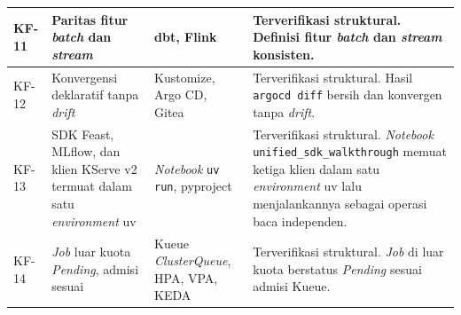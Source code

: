 {\begin{longtable}{|>{\centering\arraybackslash}m{1.7cm}|m{3.9cm}|m{2.8cm}|m{4.4cm}|}
\hline
KF-11 & Paritas fitur \textit{batch} dan \textit{stream} & dbt, Flink & Terverifikasi struktural. Definisi fitur \textit{batch} dan \textit{stream} konsisten. \\
\hline
KF-12 & Konvergensi deklaratif tanpa \textit{drift} & Kustomize, Argo CD, Gitea & Terverifikasi struktural. Hasil \texttt{argocd diff} bersih dan konvergen tanpa \textit{drift}. \\
\hline
KF-13 & SDK Feast, MLflow, dan klien KServe v2 termuat dalam satu \textit{environment} uv & \textit{Notebook} \texttt{uv run}, pyproject & Terverifikasi struktural. \textit{Notebook} \texttt{unified\_sdk\_walkthrough} memuat ketiga klien dalam satu \textit{environment} uv lalu menjalankannya sebagai operasi baca independen. \\
\hline
KF-14 & \textit{Job} luar kuota \textit{Pending}, admisi sesuai & Kueue \textit{ClusterQueue}, HPA, VPA, KEDA & Terverifikasi struktural. \textit{Job} di luar kuota berstatus \textit{Pending} sesuai admisi Kueue. \\
\hline


\end{longtable}}
